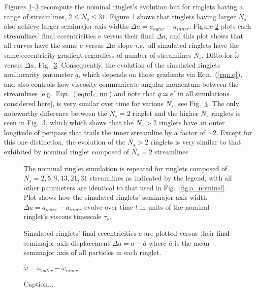 \documentclass[preprint]{aastex62}
\begin{document}
Figures \ref{fig:a_versus_t_streamlines}--\ref{fig:wt_vs_da_streamlines} recompute the nominal
ringlet's evolution but for ringlets having a range of streamlines, $2\le N_s\le31$. 
Figure \ref{fig:a_versus_t_streamlines} shows that ringlets having larger $N_s$
also achieve larger semimajor axis widths $\Delta a = a_{outer} - a_{inner}$. Figure  
\ref{fig:e_vs_da_streamlines} plots each streamlines' final eccentricities $e$
versus their final $\Delta a$, and this plot shows
that all curves have the same $e$ versus $\Delta a$ slope
{\it i.e.}\ all simulated ringlets have the same eccentricity gradient regardless of 
number of streamlines $N_s$. Ditto for $\tilde{\omega}$ versus $\Delta a$, 
Fig.\ \ref{fig:wt_vs_da_streamlines}.
Consequently, the evolution of the simulated ringlets
nonlinearity parameter $q$, which depends on those gradients via Eqn.\ (\ref{eqn:q}), and also
controls how viscosity communicate angular momentum between
the streamlines [e.g.\ Eqn.\ (\ref{eqn:L_nu}) 
and note that $q\simeq e'$ in all simulations considered here], 
is very similar over time for various $N_s$, see Fig.\ \ref{fig:q_versus_t_streamlines}.
The only noteworthy difference between the $N_s=2$ ringlet and the higher $N_s$
ringlets is seen in Fig.\ \ref{fig:wt_vs_da_streamlines}, which 
which shows that the $N_s>2$ ringlets have an outer longitude of peripase that trails
the inner streamline by a factor of $\sim2$. Except for this one distinction,
the evolution of the $N_s>2$ ringlets is very similar to that exhibited by nominal
ringlet composed of $N_s=2$ streamlines 
\begin{figure}
    \caption{
        \label{fig:a_versus_t_streamlines}
        The nominal ringlet simulation is repeated for ringlets composed of $N_s=2,5,9,13,21,31$ streamlines
        as indicated by the legend, with all other parameters are identical to that used in Fig.\ \ref{fig:a_nominal}.
        Plot shows how the simulated ringlets' semimajor axis width $\Delta a = a_{outer} - a_{inner}$
        evolve over time $t$ in units of the nominal ringlet's viscous timescale $\tau_\nu$.
    }
\end{figure}
\begin{figure}
    \caption{
        \label{fig:e_vs_da_streamlines}
        Simulated ringlets' final eccentricities $e$ are plotted versus their final
        semimajor axis displacement $\Delta a=a-\bar{a}$ where $\bar{a}$ is the mean semimajor
        axis of all particles in each ringlet.
    }
\end{figure}
\begin{figure}
    \caption{
        \label{fig:wt_vs_da_streamlines}
        $\tilde{\omega} = \tilde{\omega}_{outer} - \tilde{\omega}_{inner}$
    }
\end{figure}
\begin{figure}
    \caption{
        \label{fig:q_versus_t_streamlines}
        Caption...
    }
\end{figure}
\end{document}
